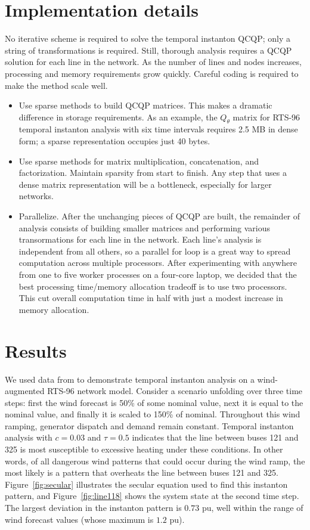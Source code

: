 \documentclass[conference]{IEEEtran}
\begin{document}
\section{Implementation details}
\label{sec:implementation-details}

No iterative scheme is required to solve the temporal instanton QCQP; only a string of transformations is required. Still, thorough analysis requires a QCQP solution for each line in the network. As the number of lines and nodes increases, processing and memory requirements grow quickly. Careful coding is required to make the method scale well.

\begin{itemize}
    \item Use sparse methods to build QCQP matrices. This makes a dramatic difference in storage requirements. As an example, the $Q_\theta$ matrix for RTS-96 temporal instanton analysis with six time intervals requires 2.5 MB in dense form; a sparse representation occupies just 40 bytes.
    \item Use sparse methods for matrix multiplication, concatenation, and factorization. Maintain sparsity from start to finish. Any step that uses a dense matrix representation will be a bottleneck, especially for larger networks.
    \item Parallelize. After the unchanging pieces of QCQP are built, the remainder of analysis consists of building smaller matrices and performing various transormations for each line in the network. Each line's analysis is independent from all others, so a parallel for loop is a great way to spread computation across multiple processors. After experimenting with anywhere from one to five worker processes on a four-core laptop, we decided that the best processing time/memory allocation tradeoff is to use two processors. This cut overall computation time in half with just a modest increase in memory allocation.
\end{itemize}


\section{Results}\label{sec:results}

We used data from \cite{pandzic} to demonstrate temporal instanton
analysis on a wind-augmented RTS-96 network model. Consider a scenario
unfolding over three time steps: first the wind forecast is 50\% of
some nominal value, next it is equal to the nominal value, and finally
it is scaled to 150\% of nominal. Throughout this wind ramping,
generator dispatch and demand remain constant. Temporal instanton
analysis with $c=0.03$ and $\tau=0.5$ indicates that the line between
buses 121 and 325 is most susceptible to excessive heating under these
conditions. In other words, of all dangerous wind patterns that could
occur during the wind ramp, the most likely is a pattern that
overheats the line between buses 121 and 325. Figure~\ref{fig:secular}
illustrates the secular equation used to find this instanton pattern,
and Figure~\ref{fig:line118} shows the system state at the second time
step. The largest deviation in the instanton pattern is $0.73$ pu,
well within the range of wind forecast values (whose maximum is $1.2$
pu).
\end{document}
